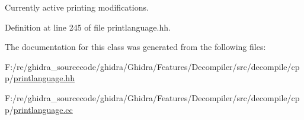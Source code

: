 Currently active printing modifications. 



Definition at line 245 of file printlanguage.\+hh.



The documentation for this class was generated from the following files\+:\begin{DoxyCompactItemize}
\item 
F\+:/re/ghidra\+\_\+sourcecode/ghidra/\+Ghidra/\+Features/\+Decompiler/src/decompile/cpp/\mbox{\hyperlink{printlanguage_8hh}{printlanguage.\+hh}}\item 
F\+:/re/ghidra\+\_\+sourcecode/ghidra/\+Ghidra/\+Features/\+Decompiler/src/decompile/cpp/\mbox{\hyperlink{printlanguage_8cc}{printlanguage.\+cc}}\end{DoxyCompactItemize}
